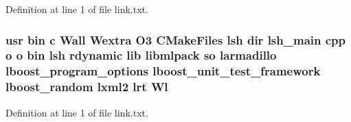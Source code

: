 Definition at line 1 of file link.\-txt.

\subsubsection[{Wl}]{\setlength{\rightskip}{0pt plus 5cm}usr bin c Wall Wextra O3 C\-Make\-Files lsh dir lsh\-\_\-main cpp o o bin lsh rdynamic lib libmlpack so larmadillo lboost\-\_\-program\-\_\-options lboost\-\_\-unit\-\_\-test\-\_\-framework lboost\-\_\-random lxml2 lrt Wl}\label{methods_2lsh_2CMakeFiles_2lsh_8dir_2link_8txt_a898cc920d4f01c5dbc9ccaf1718b4d4a}


Definition at line 1 of file link.\-txt.

